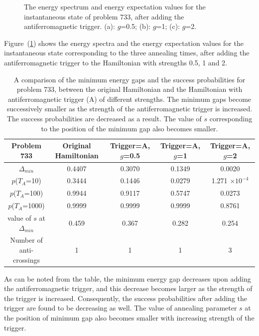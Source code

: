 \documentclass[../main.tex]{subfiles}
\begin{document}
\begin{figure}
\caption{The energy spectrum and energy expectation values for the instantaneous state of problem 733, after adding the antiferromagnetic trigger. (a): $g$=0.5; (b): $g$=1; (c): $g$=2.}
\label{fig:a1}
\end{figure}
Figure~(\ref{fig:a1}) shows the energy spectra and the energy expectation values for the instantaneous state corresponding to the three annealing times, after adding the antiferromagnetic trigger to the Hamiltonian with strengths 0.5, 1 and 2.

\begin{table}[H]
\centering
\renewcommand{\arraystretch}{1.5}
\begin{tabular}{|c|c|c|c|c|}
\hline 
Problem 733 & Original Hamiltonian & Trigger=A, $g$=0.5 & Trigger=A, $g$=1 & Trigger=A, $g$=2 \\ 
\hline 
$\Delta_{min}$ & 0.4407 & 0.3070 & 0.1349 & 0.0020 \\ 
\hline 
$p$($T_A$=10) & 0.3444 & 0.1446 & 0.0279 & 1.271 $\times 10^{-4}$ \\ 
\hline 
$p$($T_A$=100) & 0.9944 & 0.9117 & 0.5747 & 0.0273 \\ 
\hline 
$p$($T_A$=1000) & 0.9999 & 0.9999 & 0.9999 & 0.8761 \\ 
\hline 
value of $s$ at $\Delta_{min}$ & 0.459 & 0.367 & 0.282 & 0.254 \\ 
\hline
Number of anti-crossings & 1 & 1 & 1 & 3 \\
\hline
\end{tabular} 
\caption{A comparison of the minimum energy gaps and the success probabilities for problem 733, between the original Hamiltonian and the Hamiltonian with antiferromagnetic trigger (A) of different strengths. The minimum gaps become successively smaller as the strength of the antiferromagnetic trigger is increased. The success probabilities are decreased as a result. The value of $s$ corresponding to the position of the minimum gap also becomes smaller.}
\label{tab:a1}
\end{table}
As can be noted from the table, the minimum energy gap decreases upon adding the antiferromagnetic trigger, and this decrease becomes larger as the strength of the trigger is increased. Consequently, the success probabilities after adding the trigger are found to be decreasing as well. The value of annealing parameter $s$ at the position of minimum gap also becomes smaller with increasing strength of the trigger.\\
\end{document}
